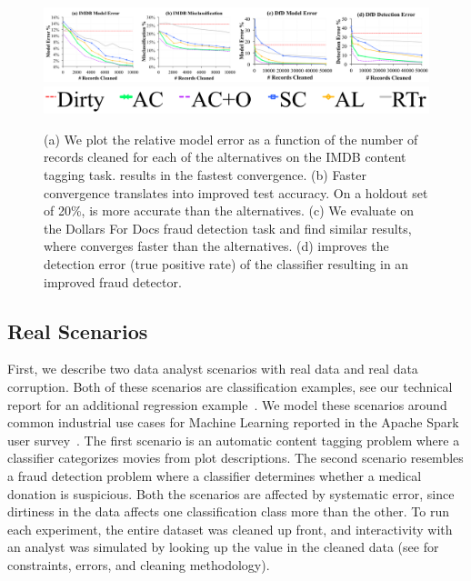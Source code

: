 \begin{figure}[t]
\centering
 \includegraphics[width=\textwidth]{exp/real-experiments-full.png}
 \includegraphics[width=0.6\columnwidth]{exp/legend-real.png}\vspace{-1em}
 \caption{(a) We plot the relative model error as a function of the number of records cleaned for each of the alternatives on the IMDB content tagging task. \sys results in the fastest convergence. (b) Faster convergence translates into improved test accuracy. On a holdout set of 20\%, \sys is more accurate than the alternatives. (c) We evaluate \sys on the Dollars For Docs fraud detection task and find similar results, where \sys converges faster than the alternatives. (d) \sys improves the detection error (true positive rate) of the classifier resulting in an improved fraud detector. \label{real}}\vspace{-1.5em}
\end{figure}

\subsection{Real Scenarios}\label{real-errors}
First, we describe two data analyst scenarios with real data and real data corruption.
Both of these scenarios are classification examples, see our technical report for an additional regression example~\cite{activecleanarxiv}.
We model these scenarios around common industrial use cases for Machine Learning reported in the Apache Spark user survey~\cite{sparksurvey}.
The first scenario is an automatic content tagging problem where a classifier categorizes movies from plot descriptions.
The second scenario resembles a fraud detection problem where a classifier determines whether a medical donation is suspicious.
Both the scenarios are affected by systematic error, since dirtiness in the data affects one classification class more than the other.
To run each experiment, the entire dataset was cleaned up front, and interactivity with an analyst was simulated by looking up the value in the cleaned data (see \cite{activecleanarxiv} for constraints, errors, and cleaning methodology). 

